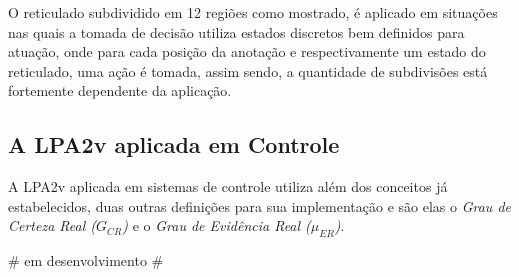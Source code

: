 O reticulado subdividido em 12 regiões como mostrado, é aplicado em situações nas quais a tomada de decisão utiliza estados discretos bem definidos para atuação, onde para cada posição da anotação e respectivamente um estado do reticulado, uma ação é tomada, assim sendo, a quantidade de subdivisões está fortemente dependente da aplicação.



\subsection{A LPA2v aplicada em Controle}

A LPA2v aplicada em sistemas de controle utiliza além dos conceitos já estabelecidos, duas outras definições para sua implementação e são elas o \emph{ Grau de Certeza Real ($G _{CR}$)} e o \emph{Grau de Evidência Real ($\mu _{ER}$)}.

\# em desenvolvimento \#




